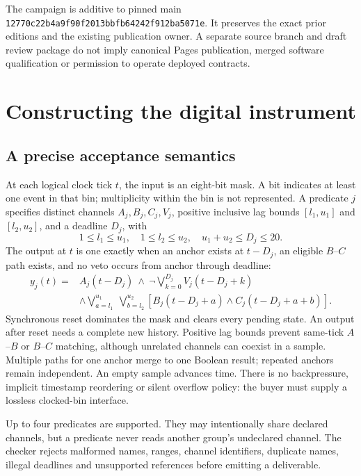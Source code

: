 The campaign is additive to pinned main \texttt{12770c22b4a9f90f2013bbfb64242f912ba5071e}. It preserves the exact prior editions and the existing publication owner. A separate source branch and draft review package do not imply canonical Pages publication, merged software qualification or permission to operate deployed contracts.

\section{Constructing the digital instrument}
\subsection{A precise acceptance semantics}
At each logical clock tick $t$, the input is an eight-bit mask. A bit indicates at least one event in that bin; multiplicity within the bin is not represented. A predicate $j$ specifies distinct channels $A_j,B_j,C_j,V_j$, positive inclusive lag bounds $[l_1,u_1]$ and $[l_2,u_2]$, and a deadline $D_j$, with
\begin{equation}
1\le l_1\le u_1,\quad 1\le l_2\le u_2,\quad u_1+u_2\le D_j\le20.
\end{equation}
The output at $t$ is one exactly when an anchor exists at $t-D_j$, an eligible $B$--$C$ path exists, and no veto occurs from anchor through deadline:
\begin{align}
y_j(t)={}& A_j(t-D_j)\ \wedge\ \neg\bigvee_{k=0}^{D_j}V_j(t-D_j+k)\nonumber\\
&\wedge\bigvee_{a=l_1}^{u_1}\ \bigvee_{b=l_2}^{u_2}
\left[B_j(t-D_j+a)\wedge C_j(t-D_j+a+b)\right].\label{eq:contract}
\end{align}
Synchronous reset dominates the mask and clears every pending state. An output after reset needs a complete new history. Positive lag bounds prevent same-tick $A$--$B$ or $B$--$C$ matching, although unrelated channels can coexist in a sample. Multiple paths for one anchor merge to one Boolean result; repeated anchors remain independent. An empty sample advances time. There is no backpressure, implicit timestamp reordering or silent overflow policy: the buyer must supply a lossless clocked-bin interface.

Up to four predicates are supported. They may intentionally share declared channels, but a predicate never reads another group's undeclared channel. The checker rejects malformed names, ranges, channel identifiers, duplicate names, illegal deadlines and unsupported references before emitting a deliverable.

